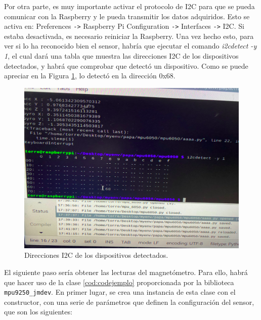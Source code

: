 Por otra parte, es muy importante activar el protocolo de I2C para que se pueda comunicar con la Raspberry y le pueda transmitir los datos adquiridos. Esto se activa en: Preferences \texttt{->} Raspberry Pi Configuration \texttt{->} Interfaces \texttt{->} I2C. Si estaba desactivada, es necesario reiniciar la Raspberry. Una vez hecho esto, para ver si lo ha reconocido bien el sensor, habría que ejecutar el comando \textit{i2cdetect -y 1}, el cual dará una tabla que muestra las direcciones I2C de los dispositivos detectados, y habrá que comprobar que detectó un dispositivo. Como se puede apreciar en la Figura \ref{fig:bus}, lo detectó en la dirección 0x68.


\begin{figure}[H]
  \centering
  \includegraphics[scale=0.3]{figs/bus} %
  \caption{ Direcciones I2C de los dispositivos detectados.}
  \label{fig:bus}
\end{figure}

El siguiente paso sería obtener las lecturas del magnetómetro. Para ello, habrá que hacer uso de la clase \ref{cod:codejemplo} proporcionada por la biblioteca \texttt{mpu9250\_jmdev}. En primer lugar, se crea una instancia de esta clase con el constructor, con una serie de parámetros que definen la configuración del sensor, que son los siguientes:

